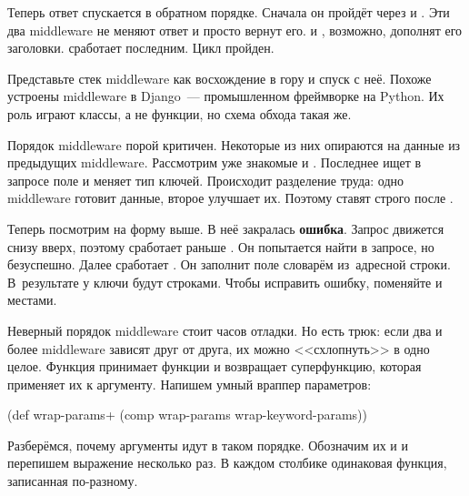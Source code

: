 Теперь ответ спускается в обратном порядке. Сначала он пройдёт через
 и . Эти два middleware не меняют
ответ и просто вернут его.  и ,
возможно, дополнят его заголовки.  сработает
последним. Цикл пройден.


Представьте стек middleware как восхождение в гору и спуск с неё. Похоже
устроены middleware в Django~--- промышленном фреймворке на Python. Их роль
играют классы, а не функции, но схема обхода такая же.

Порядок middleware порой критичен. Некоторые из них опираются на данные из
предыдущих middleware. Рассмотрим уже знакомые  и
. Последнее ищет в запросе поле  и меняет
тип ключей. Происходит разделение труда: одно middleware готовит данные, второе
улучшает их. Поэтому  ставят строго после
.


Теперь посмотрим на форму  выше. В неё
закралась \textbf{ошибка}. Запрос движется снизу вверх, поэтому
 сработает раньше . Он попытается найти
 в запросе, но безуспешно. Далее сработает 
. Он заполнит поле словарём из~адресной строки. В~результате у
 ключи будут строками. Чтобы исправить ошибку, поменяйте
 и  местами.

Неверный порядок middleware стоит часов отладки. Но есть трюк: если два и более
middleware зависят друг от друга, их можно <<схлопнуть>> в одно целое. Функция
 принимает функции и возвращает суперфункцию, которая применяет их
к аргументу. Напишем умный враппер параметров:


\begin{clojure}
(def wrap-params+
  (comp wrap-params wrap-keyword-params))
\end{clojure}

Разберёмся, почему аргументы  идут в таком порядке. Обозначим
их  и  и перепишем выражение несколько раз. В каждом
столбике одинаковая функция, записанная по-разному.

\ifnarrow


